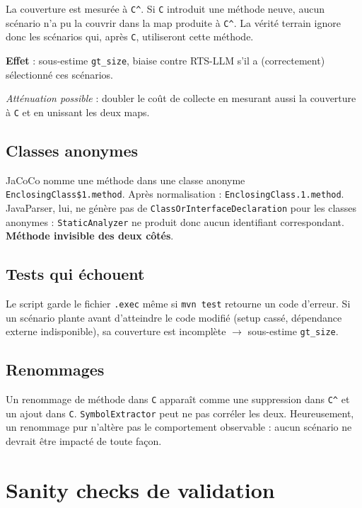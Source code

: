 \documentclass[11pt,a4paper]{article}
\begin{document}
La couverture est mesurée à \texttt{C\^{}}. Si \texttt{C} introduit une méthode neuve, aucun scénario n'a pu la \og couvrir \fg{} dans la map produite à \texttt{C\^{}}. La vérité terrain ignore donc les scénarios qui, après \texttt{C}, utiliseront cette méthode.

\textbf{Effet} : sous-estime \texttt{gt\_size}, biaise contre RTS-LLM s'il a (correctement) sélectionné ces scénarios.

\emph{Atténuation possible} : doubler le coût de collecte en mesurant aussi la couverture à \texttt{C} et en unissant les deux maps.

\subsection{Classes anonymes}

JaCoCo nomme une méthode dans une classe anonyme \texttt{EnclosingClass\$1.method}. Après normalisation : \texttt{EnclosingClass.1.method}. JavaParser, lui, ne génère pas de \texttt{ClassOrInterfaceDeclaration} pour les classes anonymes : \texttt{StaticAnalyzer} ne produit donc aucun identifiant correspondant. \textbf{Méthode invisible des deux côtés}.

\subsection{Tests qui échouent}

Le script garde le fichier \texttt{.exec} même si \texttt{mvn test} retourne un code d'erreur. Si un scénario plante avant d'atteindre le code modifié (setup cassé, dépendance externe indisponible), sa couverture est incomplète \(\rightarrow\) sous-estime \texttt{gt\_size}.

\subsection{Renommages}

Un renommage de méthode dans \texttt{C} apparaît comme une suppression dans \texttt{C\^{}} et un ajout dans \texttt{C}. \texttt{SymbolExtractor} peut ne pas corréler les deux. Heureusement, un renommage pur n'altère pas le comportement observable : aucun scénario ne devrait être impacté de toute façon.


\section{Sanity checks de validation}
\label{sec:sanity}
\end{document}
